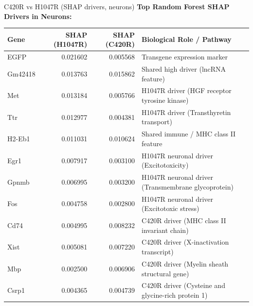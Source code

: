 \documentclass[10pt, aspectratio=169]{beamer}
\begin{document}
\begin{frame}{C420R vs H1047R (SHAP drivers, neurons)}
  \centering
  {\small \textbf{Top Random Forest SHAP Drivers in Neurons:}}\par
  \vspace{0.15cm}
  \scriptsize
  \begin{tabular}{l r r p{6.5cm}}
    \toprule
    \textbf{Gene} & \textbf{SHAP (H1047R)} & \textbf{SHAP (C420R)} & \textbf{Biological Role / Pathway} \\
    \midrule
    EGFP & 0.021602 & 0.005568 & Transgene expression marker \\
    Gm42418 & 0.013763 & 0.015862 & Shared high driver (lncRNA feature) \\
    Met & 0.013184 & 0.005766 & H1047R driver (HGF receptor tyrosine kinase) \\
    Ttr & 0.012977 & 0.004381 & H1047R driver (Transthyretin transport) \\
    H2-Eb1 & 0.011031 & 0.010624 & Shared immune / MHC class II feature \\
    Egr1 & 0.007917 & 0.003100 & H1047R neuronal driver (Excitotoxicity) \\
    Gpnmb & 0.006995 & 0.003200 & H1047R neuronal driver (Transmembrane glycoprotein) \\
    Fos & 0.004758 & 0.002800 & H1047R neuronal driver (Excitotoxic stress) \\
    Cd74 & 0.004995 & 0.008232 & C420R driver (MHC class II invariant chain) \\
    Xist & 0.005081 & 0.007220 & C420R driver (X-inactivation transcript) \\
    Mbp & 0.002500 & 0.006906 & C420R driver (Myelin sheath structural gene) \\
    Csrp1 & 0.004365 & 0.004739 & C420R driver (Cysteine and glycine-rich protein 1) \\
    \bottomrule
  \end{tabular}
\end{frame}
\end{document}
